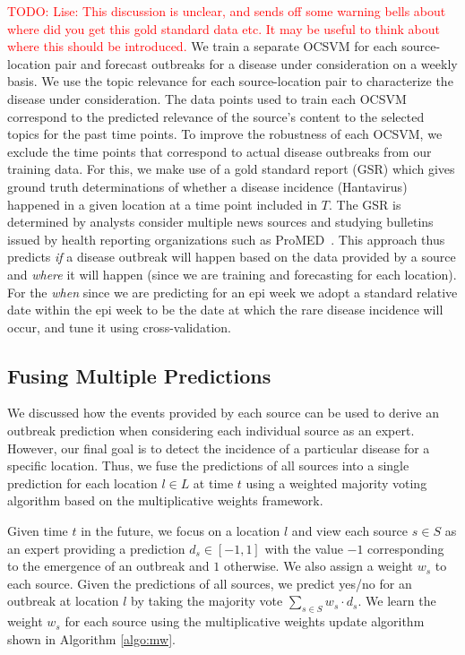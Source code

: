 \documentclass[conference]{IEEEtran}
\newcommand{\todo}[1]{\textcolor{red}{{TODO: #1}}}
\begin{document}
\todo{Lise: This discussion is unclear, and sends off some warning bells about where did you get this gold standard data etc.   It may be useful to think about where this should be introduced.} We train a separate OCSVM for each source-location pair and forecast outbreaks for a disease under consideration on a weekly basis. We use the topic relevance for each source-location pair to characterize the disease under consideration. The data points used to train each OCSVM correspond to the predicted relevance of the source's content to the selected topics for the past time points. To improve the robustness of each OCSVM, we exclude the time points that correspond to actual disease outbreaks from our training data. For this, we make use of a gold standard report (GSR) which gives ground truth determinations of whether a disease incidence (Hantavirus) happened in a given location at a time point included in $T$. The GSR is determined by analysts consider multiple news sources and studying bulletins issued by health reporting organizations such as ProMED~\cite{probmed}.  This approach thus predicts  {\em if} a disease outbreak will happen based on the data provided by a source and {\em where} it will happen (since we are training and forecasting for each location). For the {\em when} since we are predicting for an epi week we adopt a standard relative date within the epi week to be the date at which the rare disease incidence will occur, and tune it using cross-validation. 

\subsection{Fusing Multiple Predictions}
\label{sec:integration}
We discussed how the events provided by each source can be used to derive an outbreak prediction when considering each individual source as an expert. However, our final goal is to detect the incidence of a particular disease for a specific location. Thus, we fuse the predictions of all sources into a single prediction for each location $l \in L$ at time $t$ using a weighted majority voting algorithm based on the multiplicative weights framework\cite{arora:2012}.

Given time $t$ in the future, we focus on a location $l$ and view each source $s \in S$ as an expert providing a prediction $d_s \in [-1,1]$ with the value $-1$ corresponding to the emergence of an outbreak and $1$ otherwise. We also assign a weight $w_s$ to each source. Given the predictions of all sources, we predict yes/no for an outbreak at location $l$ by taking the majority vote $\sum_{s \in S} w_s \cdot d_s$.  We learn the weight $w_s$ for each source using the multiplicative weights update algorithm shown in Algorithm \ref{algo:mw}.
\end{document}
